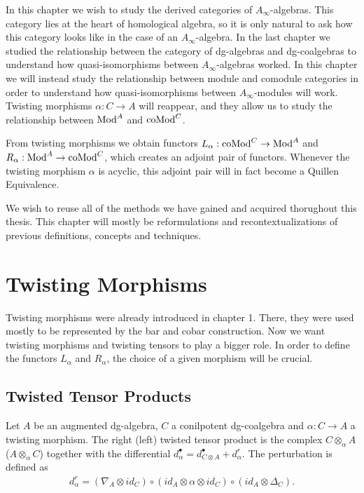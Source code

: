 \documentclass[../thesis.tex]{subfiles}
\begin{document}
    In this chapter we wish to study the derived categories of $A_\infty$-algebras. This category lies at the heart of homological algebra, so it is only natural to ask how this category looks like in the case of an $A_\infty$-algebra. In the last chapter we studied the relationship between the category of dg-algebras and dg-coalgebras to understand how quasi-isomorphisms between $A_\infty$-algebras worked. In this chapter we will instead study the relationship between module and comodule categories in order to understand how quasi-isomorphisms between $A_\infty$-modules will work. Twisting morphisms $\alpha : C \rightarrow A$ will reappear, and they allow us to study the relationship between $\tt{Mod}^A$ and $\tt{coMod}^C$.

    From twisting morphisms we obtain functors $L_\alpha : \tt{coMod}^C \rightarrow \tt{Mod}^A$ and $R_\alpha : \tt{Mod}^A \rightarrow \tt{coMod}^C$, which creates an adjoint pair of functors. Whenever the twisting morphism $\alpha$ is acyclic, this adjoint pair will in fact become a Quillen Equivalence.

    We wish to reuse all of the methods we have gained and acquired thorughout this thesis. This chapter will mostly be reformulations and recontextualizations of previous definitions, concepts and techniques. 

    \section{Twisting Morphisms}

        Twisting morphisms were already introduced in chapter 1. There, they were used mostly to be represented by the bar and cobar construction. Now we want twisting morphisms and twisting tensors to play a bigger role. In order to define the functors $L_\alpha$ and $R_\alpha$, the choice of a given morphism will be crucial.  

        \subsection{Twisted Tensor Products}

            Let $A$ be an augmented dg-algebra, $C$ a conilpotent dg-coalgebra and $\alpha : C \rightarrow A$ a twisting morphism. The right (left) twisted tensor product is the complex $C \otimes_\alpha A$ ($A\otimes_\alpha C$) together with the differential $d_\alpha^\bullet = d_{C\otimes A}^\bullet + d_\alpha^r$. The perturbation is defined as
            \begin{align*}
                d_\alpha^r = (\nabla_A\otimes id_C) \circ (id_A \otimes \alpha \otimes id_C) \circ (id_A \otimes \Delta_C).
            \end{align*}
\end{document}
